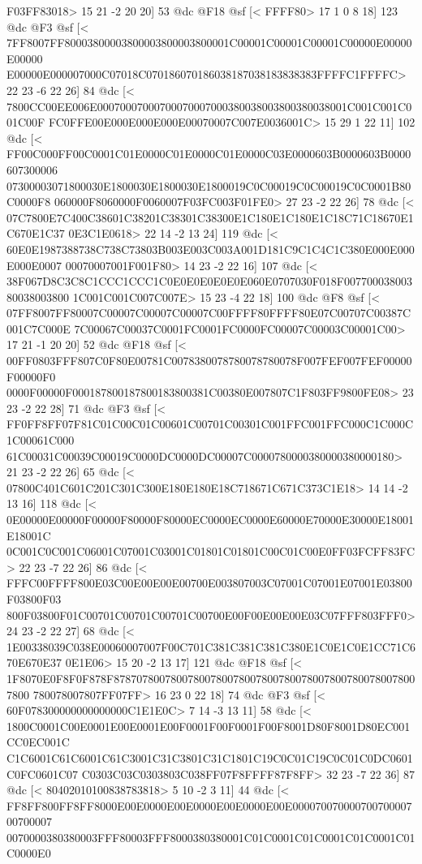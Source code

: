 {{{{{{{{{{{{{{{{{{{{{{{{{{{{{{{{{{{{{{{{{{{{{{{{{{{{{{{{{{{{{{{{{{{{{{{{{{{{{{{{{{{{{{{{{{{{{{{{{{{{{F03FF83018>
	 15 21 -2 20 20] 53 @dc
@F18 @sf
[<
FFFF80>
	 17 1 0 8 18] 123 @dc
@F3 @sf
[<
7FF8007FF80003800003800003800003800001C00001C00001C00001C00000E00000E00000
E00000E000007000C07018C070186070186038187038183838383FFFFC1FFFFC>
	 22 23 -6 22 26] 84 @dc
[<
7800CC00EE006E00070007000700070007000380038003800380038001C001C001C001C00F
FC0FFE00E000E000E000E00070007C007E0036001C>
	 15 29 1 22 11] 102 @dc
[<
FF00C000FF00C0001C01E0000C01E0000C01E0000C03E0000603B0000603B0000607300006
07300003071800030E1800030E1800030E1800019C0C00019C0C00019C0C0001B80C0000F8
060000F8060000F0060007F03FC003F01FE0>
	 27 23 -2 22 26] 78 @dc
[<
07C7800E7C400C38601C38201C38301C38300E1C180E1C180E1C18C71C18670E1C670E1C37
0E3C1E0618>
	 22 14 -2 13 24] 119 @dc
[<
60E0E1987388738C738C73803B003E003C003A001D181C9C1C4C1C380E000E000E000E0007
00070007001F001F80>
	 14 23 -2 22 16] 107 @dc
[<
38F067D8C3C8C1CCC1CCC1C0E0E0E0E0E0E060E0707030F018F00770003800380038003800
1C001C001C007C007E>
	 15 23 -4 22 18] 100 @dc
@F8 @sf
[<
07FF8007FF80007C00007C00007C00007C00FFFF80FFFF80E07C00707C00387C001C7C000E
7C00067C00037C0001FC0001FC0000FC00007C00003C00001C00>
	 17 21 -1 20 20] 52 @dc
@F18 @sf
[<
00FF0803FFF807C0F80E00781C0078380078780078780078F007FEF007FEF00000F00000F0
0000F00000F000187800187800183800381C00380E007807C1F803FF9800FE08>
	 23 23 -2 22 28] 71 @dc
@F3 @sf
[<
FF0FF8FF07F81C01C00C01C00601C00701C00301C001FFC001FFC000C1C000C1C00061C000
61C00031C00039C00019C0000DC0000DC00007C0000780000380000380000180>
	 21 23 -2 22 26] 65 @dc
[<
07800C401C601C201C301C300E180E180E18C718671C671C373C1E18>
	 14 14 -2 13 16] 118 @dc
[<
0E00000E00000F00000F80000F80000EC0000EC0000E60000E70000E30000E18001E18001C
0C001C0C001C06001C07001C03001C01801C01801C00C01C00E0FF03FCFF83FC>
	 22 23 -7 22 26] 86 @dc
[<
FFFC00FFFF800E03C00E00E00E00700E003807003C07001C07001E07001E03800F03800F03
800F03800F01C00701C00701C00701C00700E00F00E00E00E03C07FFF803FFF0>
	 24 23 -2 22 27] 68 @dc
[<
1E00338039C038E00060007007F00C701C381C381C381C380E1C0E1C0E1CC71C670E670E37
0E1E06>
	 15 20 -2 13 17] 121 @dc
@F18 @sf
[<
1F8070E0F8F0F878F878707800780078007800780078007800780078007800780078007800
780078007807FF07FF>
	 16 23 0 22 18] 74 @dc
@F3 @sf
[<
60F078300000000000000C1E1E0C>
	 7 14 -3 13 11] 58 @dc
[<
1800C0001C00E0001E00E0001E00F0001F00F0001F00F8001D80F8001D80EC001CC0EC001C
C1C6001C61C6001C61C3001C31C3801C31C1801C19C0C01C19C0C01C0DC0601C0FC0601C07
C0303C03C0303803C038FF07F8FFFF87F8FF>
	 32 23 -7 22 36] 87 @dc
[<
80402010100838783818>
	 5 10 -2 3 11] 44 @dc
[<
FF8FF800FF8FF8000E00E0000E00E0000E00E0000E00E00007007000070070000700700007
0070000380380003FFF80003FFF8000380380001C01C0001C01C0001C01C0001C01C0000E0
}}}}}}}}}}}}}}}}}}}}}}}}}}}}}}}}}}}}}}}}}}}}}}}}}}}}}}}}}}}}}}}}}}}}}}}}}}}}}}}}}}}}}}}}}}}}}}}}}}}}}
